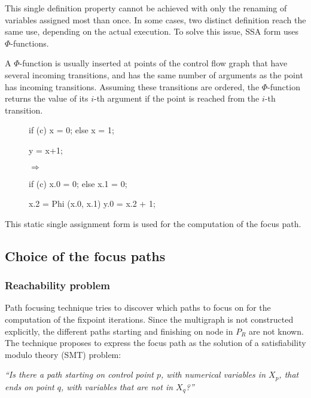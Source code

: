 \documentclass[a4paper,english,titlepage,11pt]{report}
\begin{document}
This single definition property cannot be achieved with only the renaming of
variables assigned most than once. In some cases, two distinct definition reach
the same use, depending on the actual execution. To solve this issue, SSA form
uses $\Phi$-functions.

A $\Phi$-function is usually inserted at points of the control flow graph that
have several incoming transitions, and has the same number of arguments as the point
has incoming transitions. Assuming these transitions are ordered, the
$\Phi$-function returns the value of its $i$-th argument if the point is reached
from the $i$-th transition.

\begin{figure}[!h]
\centering
\begin{minipage}[c]{.39\linewidth}
\begin{C}
if (c) x = 0;
else x = 1;

y = x+1;
\end{C}
\end{minipage} 
$\Longrightarrow$ \hfill
\begin{minipage}[c]{.49\linewidth}
\begin{C}
if (c) x.0 = 0;
else x.1 = 0;

x.2 = Phi (x.0, x.1)
y.0 = x.2 + 1;
\end{C}
\end{minipage}
\end{figure}
\FloatBarrier

This static single assignment form is used for the computation of the focus
path.

	\subsection{Choice of the focus paths}

	\subsubsection{Reachability problem}
	\label{reachability}
	Path focusing technique tries to discover which paths to focus on for the
	computation of the fixpoint iterations. 
	Since the multigraph is not constructed explicitly, the different paths
	starting and finishing on node in $P_R$ are not known. 
	The technique proposes to express the focus path as the solution of a
	satisfiability modulo theory (SMT) problem:

	\begin{center} \emph{
		``Is there a path starting on control point $p$, with numerical
		variables in $X_p$, that ends on point $q$, with variables that are not
		in $X_q$?''}
	\end{center}
\end{document}
